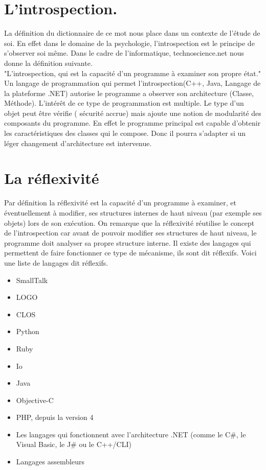 \documentclass[a4paper,11pt]{report}
\begin{document}
{\newpage

\section{L'introspection.}

\normalsize{
La définition du dictionnaire de ce mot nous place dans un contexte de l'étude de soi. En effet dans le domaine de la psychologie, l'introspection est le principe de s'observer soi même. Dans le cadre de l'informatique, technoscience.net nous donne la définition suivante. \\

"L'introspection, qui est la capacité d'un programme à examiner son propre état." \\

Un langage de programmation qui permet l'introspection(C++, Java, Langage de la plateforme .NET) autorise le programme a observer son architecture (Classe, Méthode). L'intérêt de ce type de programmation est multiple. Le type d'un objet peut être vérifie ( sécurité accrue) mais ajoute une notion de modularité des composants du programme. En effet le programme principal est capable d'obtenir les caractéristiques des classes qui le compose. Donc il pourra s'adapter si un léger changement d'architecture est intervenue.
}

\section{La réflexivité}

\normalsize{
Par définition la réflexivité est la capacité d'un programme à examiner, et éventuellement à modifier, ses structures internes de haut niveau (par exemple ses objets) lors de son exécution. On remarque que la réflexivité réutilise le concept de l'introspection car avant de pouvoir modifier ses structures de haut niveau, le programme doit analyser sa propre structure interne.
Il existe des langages qui permettent de faire fonctionner ce type de mécanisme, ils sont dit réflexifs. Voici une liste de langages dit réflexifs. 
\begin{itemize}
\item SmallTalk
\item LOGO
\item CLOS
\item Python
\item Ruby
\item Io
\item Java
\item Objective-C
\item PHP, depuis la version 4
\item Les langages qui fonctionnent avec l'architecture .NET (comme le C\#, le Visual Basic, le J\# ou le C++/CLI)
\item Langages assembleurs
\end{itemize}

}}
\end{document}
